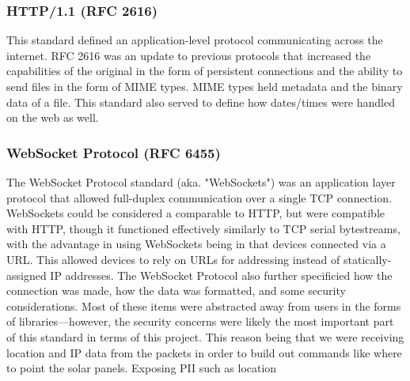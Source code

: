 \subsubsection{HTTP/1.1 (RFC 2616)}
This standard defined an application-level protocol communicating across the internet. RFC 2616 was an update to previous protocols that increased the capabilities of the original in the form of persistent connections and the ability to send files in the form of MIME types. MIME types held metadata and the binary data of a file. This standard also served to define how dates/times were handled on the web as well.
\subsubsection{WebSocket Protocol (RFC 6455)} \label{websocket_protocol}
The WebSocket Protocol standard (aka. "WebSockets") was an application layer protocol that allowed full-duplex communication over a single TCP connection. WebSockets could be considered a comparable to HTTP, but were compatible with HTTP, though it functioned effectively similarly to TCP serial bytestreams, with the advantage in using WebSockets being in that devices connected via a URL. This allowed devices to rely on URLs for addressing instead of statically-assigned IP addresses. The WebSocket Protocol also further specificied how the connection was made, how the data was formatted, and some security considerations. Most of these items were abstracted away from users in the forms of libraries---however, the security concerns were likely the most important part of this standard in terms of this project. This reason being that we were receiving location and IP data from the packets in order to build out commands like where to point the solar panels. Exposing PII such as location